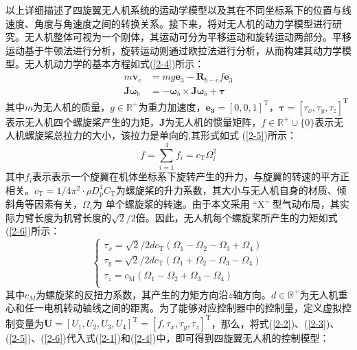 \documentclass[lang=chs, degree=master, blindreview=false, winfonts=true]{yanputhesis}
\begin{document}
以上详细描述了四旋翼无人机系统的运动学模型以及其在不同坐标系下的位置与线速度、角度与角速度之间的转换关系。接下来，将对无人机的动力学模型进行研究。无人机整体可视为一个刚体，其运动可分为平移运动和旋转运动两部分。平移运动基于牛顿法进行分析，旋转运动则通过欧拉法进行分析，从而构建其动力学模型。无人机动力学的基本方程如式(\ref{2-4})所示：
\begin{equation}
	\begin{aligned}
		m\dot{\boldsymbol{v}}_e&=mg\bm{e}_{3}-\boldsymbol{R}_{b-e}f\bm{e}_{3}\\
		\boldsymbol{J}\dot{\boldsymbol{\omega}_b}&=-\bm \omega_b \times \bm J \bm \omega_b+\boldsymbol{\tau}
	\end{aligned}\label{2-4}
\end{equation}
其中$m$为无人机的质量，$g\in\mathbb{R}^+$为重力加速度，$\bm{e_{3}}=\left[0,0,1\right]^\mathrm{T}$，$\boldsymbol{\tau}=\left[\tau_x,\tau_y,\tau_z\right]^\mathrm{T}$表示无人机四个螺旋桨产生的力矩，$\boldsymbol{J}$为无人机的惯量矩阵，$f\in\mathbb{R}^+\cup\{0\}$表示无人机螺旋桨总拉力的大小，该拉力是单向的,其形式如式 (\ref{2-5})所示：
\begin{equation}
	f=\sum_{i=1}^4f_i=c_\mathrm{T}\Omega_i^2
	\label{2-5}
\end{equation}
其中$f_i$表示表示一个旋翼在机体坐标系下旋转产生的升力，与旋翼的转速的平方正相关。$c_\mathrm{T}=1/4\pi^2\cdot\rho D_\mathrm{p}^4C_\mathrm{T}$为螺旋桨的升力系数，其大小与无人机自身的材质、倾斜角等因素有关，$\Omega_i$为
单个螺旋浆的转速。由于本文采用 “X” 型气动布局，其实际力臂长度为机臂长度的$\sqrt{2}/2$倍。因此，无人机每个螺旋桨所产生的力矩如式(\ref{2-6})所示：
\begin{equation}
	\left\{ \begin{array}{l}
		\tau_x={\sqrt{2}}/{2}dc_\mathrm{T}\left(\Omega_1-\Omega_2-\Omega_3+\Omega_4\right)\\
		\tau_y={\sqrt{2}}/{2}dc_\mathrm{T}\left(\Omega_1+\Omega_2-\Omega_3-\Omega_4\right)\\
		\tau_z=c_\mathrm{M}\left(\Omega_1-\Omega_2+\Omega_3-\Omega_4\right)\\
	\end{array} \right.
		\label{2-6}
\end{equation}
其中$c_M$为螺旋桨的反扭力系数，其产生的力矩方向沿$z$轴方向。$d\in\mathbb{R}^+$为无人机重心和任一电机转动轴线之间的距离。为了能够对应控制器中的控制量，定义虚拟控制变量为$\bm{U}=\left[U_1,U_2,U_3,U_4\right]^\mathrm{T}=\left[f,\tau_x,\tau_y,\tau_z\right]^\mathrm{T}$，那么，将式(\ref{2-2})、(\ref{2-3})、(\ref{2-5})、(\ref{2-6})代入式(\ref{2-1})和(\ref{2-4})中，即可得到四旋翼无人机的控制模型：
\end{document}
